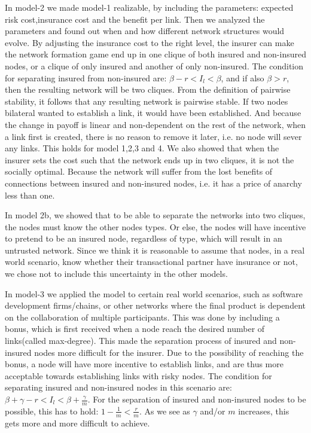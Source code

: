  In model-2 we made model-1 realizable, by including the parameters: expected risk cost,insurance cost and the benefit per link. Then we analyzed the parameters and found out when and how different network structures would evolve. By adjusting the insurance cost to the right level, the insurer can make the network formation game end up in one clique of both insured and non-insured nodes, or a clique of only insured and another of only non-insured. The condition for separating insured from non-insured are: $\beta-r<I_{l}<\beta$, and if also $\beta>r$, then the resulting network will be two cliques. From the definition of pairwise stability, it follows that any resulting network is pairwise stable. If two nodes bilateral wanted to establish a link, it would have been established. And because the change in payoff is linear and non-dependent on the rest of the network, when a link first is created, there is no reason to remove it later, i.e. no node will sever any links. This holds for model 1,2,3 and 4.
We also showed that when the insurer sets the cost such that the network ends up in two cliques, it is not the socially optimal. Because the network will suffer from the lost benefits of connections between insured and non-insured nodes, i.e. it has a price of anarchy less than one. 

In model 2b, we showed that to be able to separate the networks into two cliques, the nodes must know the other nodes types. Or else, the nodes will have incentive to pretend to be an insured node, regardless of type, which will result in an untrusted network. Since we think it is reasonable to assume that nodes, in a real world scenario, know whether their transactional partner have insurance or not, we chose not to include this uncertainty in the other models.

In model-3 we applied the model to certain real world scenarios, such as software development firms/chains, or other networks where the final product is dependent on the collaboration of multiple participants.
This was done by including a bonus, which is first received when a node reach the desired number of links(called max-degree). This made the separation process of insured and non-insured nodes more difficult for the insurer. Due to the possibility of reaching the bonus, a node will have more incentive to establish links, and are thus more acceptable towards establishing links with risky nodes. The condition for separating insured and non-insured nodes in this scenario are: $\beta+\gamma-r<I_{l}<\beta+\frac{\gamma}{m}$. For the separation of insured and non-insured nodes to be possible, this has to hold: $1-\frac{1}{m}<\frac{r}{m}$. As we see as $\gamma$ and/or $m$ increases, this gets more and more difficult to achieve. 

